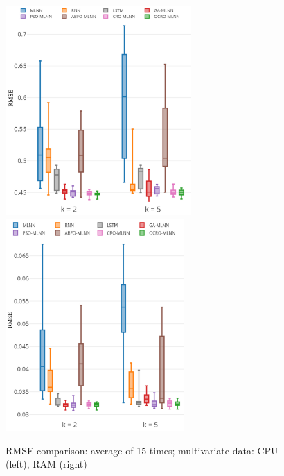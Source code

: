 \documentclass[smallcondensed, natbib]{svjour3}     %
\begin{document}
{\begin{figure}
	\centering
	\begin{minipage}[t]{1\textwidth}
		\centering
		\includegraphics[width=0.45\textwidth =0cm 0cm 0cm 0cm, height = 8cm]{stability/st_cpu_2.pdf}
		\centering
		\includegraphics[width=0.45\textwidth =0cm 0cm 0cm 0cm, height = 8.1cm]{stability/st_ram_2.pdf}
	\end{minipage}
	\caption{RMSE comparison: average of 15 times; multivariate data: CPU (left), RAM (right)} 
	\label{fig:stability_multi}
\end{figure}

}
\end{document}
